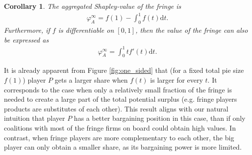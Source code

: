 \documentclass[a4paper]{article}
\newtheorem{corollary}{Corollary}
\newcommand{\dt}{\mathrm{d}t}
\begin{document}
\begin{corollary}
    \label{cor:fringe_value}
    The aggregated Shapley-value of the fringe is
    \begin{align*}
        \varphi_A^\infty = f(1) - \int_0^1 f(t) \dt.
    \end{align*}
    Furthermore, if $f$ is differentiable on $[0, 1]$, then the value of the fringe can also be expressed as
    \begin{align*}
        \varphi_A^\infty = \int_0^1 t f'(t) \dt.
    \end{align*}
\end{corollary}

It is already apparent from Figure \ref{fig:one_sided} that (for a fixed total pie size $f(1)$) player $P$ gets a larger share when $f(t)$ is larger for every $t$.
It corresponds to the case when only a relatively small fraction of the fringe is needed to create a large part of the total potential surplus (e.g. fringe players products are substitutes of each other).
This result aligns with our natural intuition that player $P$ has a better bargaining position in this case, than if only coalitions with most of the fringe firms on board could obtain high values.
In contrast, when fringe players are more complementary to each other, the big player can only obtain a smaller share, as its bargaining power is more limited.
\end{document}
